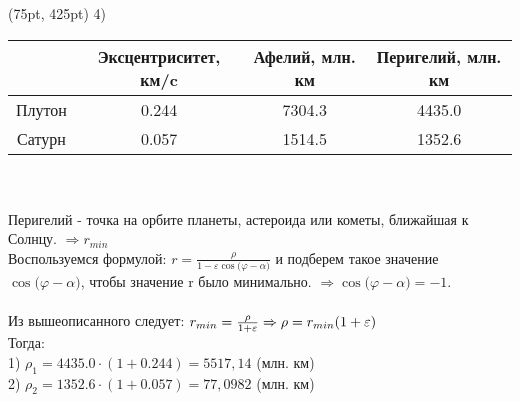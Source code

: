 \documentclass{article}
\begin{document}
\begin{textblock*}{475pt}(75pt, 425pt)
4) \begin{tabular}{| c | c | c | c |}
\hline
\hspace{0em} & Эксцентриситет, км/c & Афелий, млн. км & Перигелий, млн. км \\ \hline
Плутон & 0.244 & 7304.3 & 4435.0  \\ \hline
Сатурн & 0.057 & 1514.5 & 1352.6\\ 
\hline
\end{tabular} \\
\hspace{0em} \\
Перигелий - точка на орбите планеты, астероида или кометы, ближайшая к Солнцу. $\Rightarrow r_{min}$ \\
Воспользуемся формулой: \large{$r = \frac{\rho}{1 - \varepsilon\cos{(\varphi - \alpha})}$} \normalsize{и подберем такое значение $\cos{(\varphi - \alpha})$, чтобы значение r было минимально. $\Rightarrow \cos{(\varphi - \alpha}) = -1$}.\\
\hspace{0em} \\
Из вышеописанного следует: \large $r_{min} = \frac{\rho}{1 + \varepsilon} \Rightarrow \normalsize {\rho = r_{min}(1 + \varepsilon)}$ \\
Тогда: \\
1) $\rho_1 = 4435.0 \cdot (1 + 0.244) = 5517,14$ (млн. км)\\
2) $\rho_2 = 1352.6 \cdot (1 + 0.057) = 77,0982$ (млн. км)
\end{textblock*}
\hspace{0em}
\newpage
\hspace{0em}
\end{document}
